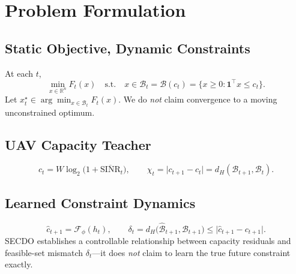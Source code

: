\section{Problem Formulation}
\label{sec:problem}

\subsection{Static Objective, Dynamic Constraints}
At each $t$,
\begin{equation}
\min_{x\in\mathbb{R}^n} F_t(x)
\quad\text{s.t.}\quad
x\in\mathcal{B}_t=\mathcal{B}(c_t)=\{x\ge 0:\mathbf{1}^\top x\le c_t\}.
\end{equation}
Let $x_t^\star\in\arg\min_{x\in\mathcal{B}_t}F_t(x)$.
We do \emph{not} claim convergence to a moving unconstrained optimum.

\subsection{UAV Capacity Teacher}
\begin{equation}
c_t=W\log_2\bigl(1+\overline{\mathrm{SINR}}_t\bigr),\qquad
\chi_t=\lvert c_{t+1}-c_t\rvert=d_H(\mathcal{B}_{t+1},\mathcal{B}_t).
\end{equation}

\subsection{Learned Constraint Dynamics}
\begin{equation}
\hat c_{t+1}=\mathcal{F}_\phi(h_t),\qquad
\delta_t=d_H\bigl(\hat{\mathcal{B}}_{t+1},\mathcal{B}_{t+1}\bigr)
\le \lvert\hat c_{t+1}-c_{t+1}\rvert.
\end{equation}
SECDO establishes a controllable relationship between capacity residuals and feasible-set mismatch $\delta_t$---it does \emph{not} claim to learn the true future constraint exactly.
